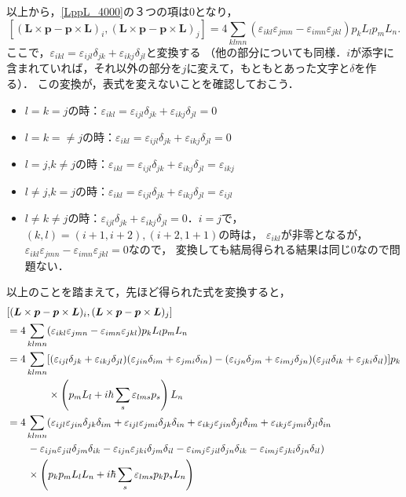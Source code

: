 以上から，\eqref{LppL_4000}の３つの項は$0$となり，
\[[(\boldsymbol{L}\times\boldsymbol{p} - \boldsymbol{p}\times\boldsymbol{L})_i,(\boldsymbol{L}\times\boldsymbol{p} - \boldsymbol{p}\times\boldsymbol{L})_j]=4\sum_{klmn}(\varepsilon_{ikl}\varepsilon_{jmn} - \varepsilon_{imn}\varepsilon_{jkl})p_kL_lp_mL_n.\]
ここで，$\varepsilon_{ikl}=\varepsilon_{ijl}\delta_{jk} + \varepsilon_{ikj}\delta_{jl}$と変換する
（他の部分についても同様．$i$が添字に含まれていれば，それ以外の部分を$j$に変えて，もともとあった文字と$\delta$を作る）．
この変換が，表式を変えないことを確認しておこう．
\begin{itemize}
  \item $l=k=j$の時：$\varepsilon_{ikl}=\varepsilon_{ijl}\delta_{jk} + \varepsilon_{ikj}\delta_{jl}=0$
  \item $l=k=\neq j$の時：$\varepsilon_{ikl}=\varepsilon_{ijl}\delta_{jk} + \varepsilon_{ikj}\delta_{jl}=0$
  \item $l=j$,$k\neq j$の時：$\varepsilon_{ikl}=\varepsilon_{ijl}\delta_{jk} + \varepsilon_{ikj}\delta_{jl}=\varepsilon_{ikj}$
  \item $l\neq j$,$k=j$の時：$\varepsilon_{ikl}=\varepsilon_{ijl}\delta_{jk} + \varepsilon_{ikj}\delta_{jl}=\varepsilon_{ijl}$
  \item $l\neq k\neq j$の時：$\varepsilon_{ijl}\delta_{jk} + \varepsilon_{ikj}\delta_{jl}=0$．$i=j$で，$(k,l)=(i + 1,i + 2),(i + 2,1 + 1)$の時は，
  $\varepsilon_{ikl}$が非零となるが，$\varepsilon_{ikl}\varepsilon_{jmn} - \varepsilon_{imn}\varepsilon_{jkl}=0$なので，
  変換しても結局得られる結果は同じ$0$なので問題ない．
\end{itemize}
以上のことを踏まえて，先ほど得られた式を変換すると，
\begin{align}
  & [(\boldsymbol{L}\times\boldsymbol{p} - \boldsymbol{p}\times\boldsymbol{L})_i,(\boldsymbol{L}\times\boldsymbol{p} - \boldsymbol{p}\times\boldsymbol{L})_j] \\
  & = 4\sum_{klmn}(\varepsilon_{ikl}\varepsilon_{jmn} - \varepsilon_{imn}\varepsilon_{jkl})p_kL_lp_mL_n\notag\\
  & = 4\sum_{klmn}[(\varepsilon_{ijl}\delta_{jk} + \varepsilon_{ikj}\delta_{jl})(\varepsilon_{jin}\delta_{im} + \varepsilon_{jmi}\delta_{in}) - (\varepsilon_{ijn}\delta_{jm} + \varepsilon_{imj}\delta_{jn})(\varepsilon_{jil}\delta_{ik} + \varepsilon_{jki}\delta_{il})]p_k \\
  & \qquad \qquad \times \left(p_mL_l + i\hbar\sum_s\varepsilon_{lms}p_s\right)L_n\notag\\
  & = 4\sum_{klmn}(\varepsilon_{ijl}\varepsilon_{jin}\delta_{jk}\delta_{im} + \varepsilon_{ijl}\varepsilon_{jmi}\delta_{jk}\delta_{in} + \varepsilon_{ikj}\varepsilon_{jin}\delta_{jl}\delta_{im} + \varepsilon_{ikj}\varepsilon_{jmi}\delta_{jl}\delta_{in}\notag\\
  & \qquad - \varepsilon_{ijn}\varepsilon_{jil}\delta_{jm}\delta_{ik} - \varepsilon_{ijn}\varepsilon_{jki}\delta_{jm}\delta_{il} - \varepsilon_{imj}\varepsilon_{jil}\delta_{jn}\delta_{ik} - \varepsilon_{imj}\varepsilon_{jki}\delta_{jn}\delta_{il})\notag\\
  & \qquad \times\left(p_kp_mL_lL_n + i\hbar\sum_s\varepsilon_{lms}p_kp_sL_n\right)\label{LppLLppL}
\end{align}
